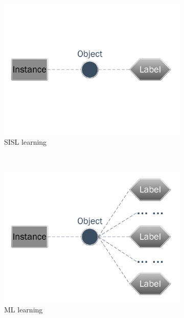 \begin{figure}[htb!]
\centering
      \begin{subfigure}[b]{0.32\textwidth}
           \includegraphics[width=1\textwidth,height=0.75\textwidth]{image/Method/SISL.pdf}
           \caption{SISL learning}
    \end{subfigure}
	~
	 \begin{subfigure}[b]{0.32\textwidth}
           \includegraphics[width=1\textwidth,height=0.75\textwidth]{image/Method/ML.pdf}
           \caption{ML learning}
    \end{subfigure}
    ~
   \begin{subfigure}[b]{0.32\textwidth}

\end{subfigure}
\end{figure}
